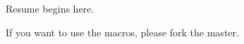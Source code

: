 \documentclass[10pt]{scrartcl}
\begin{document}
Resume begins here.

If you want to use the macros, please fork the master.
\end{document}
